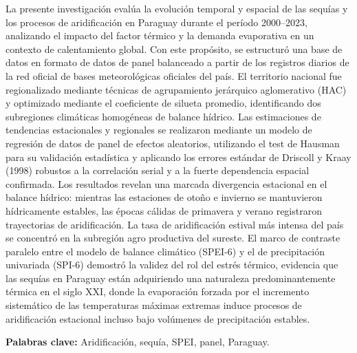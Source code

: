 \documentclass[12pt,a4paper,oneside]{book}
\begin{document}
\vspace{0.3cm}

\begingroup
\setlength{\parindent}{0pt}
\fontsize{12pt}{15pt}\selectfont\justifying
\noindent La presente investigación evalúa la evolución temporal y espacial de las sequías y los procesos de aridificación en Paraguay durante el período 2000--2023, analizando el impacto del factor térmico y la demanda evaporativa en un contexto de calentamiento global. Con este propósito, se estructuró una base de datos en formato de datos de panel balanceado a partir de los registros diarios de la red oficial de bases meteorológicas oficiales del país. El territorio nacional fue regionalizado mediante técnicas de agrupamiento jerárquico aglomerativo (HAC) y optimizado mediante el coeficiente de silueta promedio, identificando dos subregiones climáticas homogéneas de balance hídrico. Las estimaciones de tendencias estacionales y regionales se realizaron mediante un modelo de regresión de datos de panel de efectos aleatorios, utilizando el test de Hausman para su validación estadística y aplicando los errores estándar de Driscoll y Kraay (1998) robustos a la correlación serial y a la fuerte dependencia espacial confirmada. Los resultados revelan una marcada divergencia estacional en el balance hídrico: mientras las estaciones de otoño e invierno se mantuvieron hídricamente estables, las épocas cálidas de primavera y verano registraron trayectorias de aridificación. La tasa de aridificación estival más intensa del país se concentró en la subregión agro productiva del sureste. El marco de contraste paralelo entre el modelo de balance climático (SPEI-6) y el de precipitación univariada (SPI-6) demostró la validez del rol del estrés térmico, evidencia que las sequías en Paraguay están adquiriendo una naturaleza predominantemente térmica en el siglo XXI, donde la evaporación forzada por el incremento sistemático de las temperaturas máximas extremas induce procesos de aridificación estacional incluso bajo volúmenes de precipitación estables.\par

\vspace{0.8cm}

\noindent \textbf{Palabras clave:} Aridificación, sequía, SPEI, panel, Paraguay.
\endgroup
\clearpage

\clearpage
\thispagestyle{fancy} %
\end{document}
